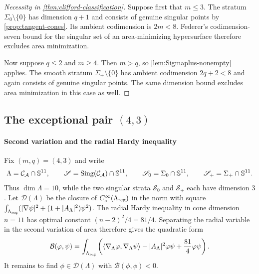 \begin{proof}[Necessity in \cref{thm:clifford-classification}]
Suppose first that $m\leq3$.  The stratum
$\Sigma_0\setminus\{0\}$ has dimension $q+1$ and consists of genuine
singular points by \cref{prop:tangent-cones}.  Its ambient codimension
is $2m<8$.  Federer's codimension-seven bound for the singular set of an
area-minimizing hypersurface \cite{Federer70} therefore excludes area
minimization.

Now suppose $q\leq2$ and $m\geq4$.  Then $m>q$, so
\cref{lem:Sigmaplus-nonempty} applies.  The smooth stratum
$\Sigma_+\setminus\{0\}$ has ambient codimension $2q+2<8$ and again
consists of genuine singular points.  The same dimension bound excludes area minimization in this case as well.
\end{proof}

\subsection{The exceptional pair \texorpdfstring{$(4,3)$}{(4,3)}}

\label{sec:instability}

\paragraph*{Second variation and the radial Hardy inequality}

Fix $(m,q)=(4,3)$ and write
\[
 \Lambda=\mathcal C_{\mathcal A}\cap\mathbb S^{11},\qquad
 \mathscr S=\operatorname{Sing}(\mathcal C_{\mathcal A})\cap\mathbb S^{11},\qquad
 \mathscr S_0=\Sigma_0\cap\mathbb S^{11},\qquad
 \mathscr S_+=\Sigma_+\cap\mathbb S^{11}.
\]
Thus $\dim\Lambda=10$, while the two singular strata $\mathscr S_0$ and
$\mathscr S_+$ each have dimension $3$.
Let \(\mathcal D(\Lambda)\) be the closure of
\(C_c^\infty(\Lambda_{\mathrm{reg}})\) in the norm with square
\(\int_{\Lambda_{\mathrm{reg}}}(|\nabla\psi|^2+(1+|A_\Lambda|^2)\psi^2)\).
The radial Hardy inequality in cone dimension \(n=11\) has optimal
constant \((n-2)^2/4=81/4\).  Separating the radial variable in the
second variation of area therefore gives the quadratic form
\[
 \mathcal B(\varphi,\psi)=\int_{\Lambda_{\mathrm{reg}}}
 \left(\langle\nabla_\Lambda\varphi,\nabla_\Lambda\psi\rangle
       -|A_\Lambda|^2\varphi\psi+\frac{81}{4}\varphi\psi\right).
\]
It remains to find \(\phi\in\mathcal D(\Lambda)\) with
\(\mathcal B(\phi,\phi)<0\).

